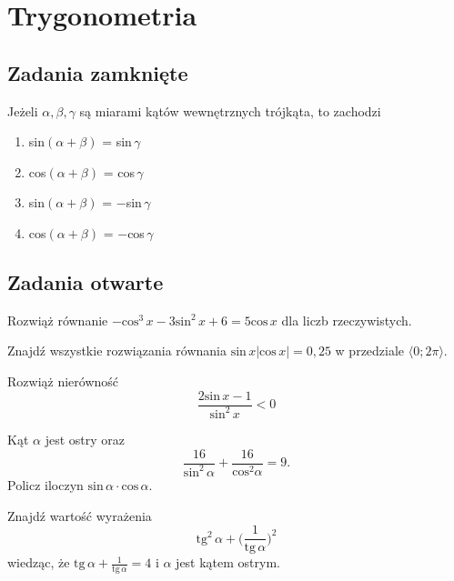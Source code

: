 \setcounter{parc}{0}
\addtocounter{chapc}{1}

\chapter{Trygonometria}

\section{Zadania zamknięte}

\zadanie Jeżeli $\alpha, \beta, \gamma$ są miarami kątów wewnętrznych trójkąta, to zachodzi
\begin{enumerate}[label=\alph*)]
	\item sin$(\alpha + \beta)$ = sin\,$\gamma$ %
	\item cos$(\alpha + \beta)$ = cos\,$\gamma$
	\item sin$(\alpha + \beta)$ = $-$sin\,$\gamma$
	\item cos$(\alpha + \beta)$ = $-$cos\,$\gamma$
\end{enumerate}

\section{Zadania otwarte}

\zadanie Rozwiąż równanie $-\text{cos}^3\,x -3\text{sin}^2\,x + 6 = 5\text{cos}\,x$ dla liczb rzeczywistych.

\zadanie Znajdź wszystkie rozwiązania równania $\text{sin}\, x|\text{cos}\,x| = 0,25$ w przedziale $\langle 0; 2\pi \rangle$.

\zadanie Rozwiąż nierówność \[ \dfrac{2\text{sin}\, x - 1}{\text{sin}^2\, x} < 0 \]

\zadanie Kąt $\alpha$ jest ostry oraz \[ \dfrac{16}{\text{sin}^2\, \alpha} + \dfrac{16}{\text{cos}^2 \alpha} = 9. \] Policz iloczyn $\text{sin}\, \alpha\cdot\text{cos}\, \alpha$.

\zadanie Znajdź wartość wyrażenia \[\text{tg}^2\,\alpha + \bigg(\frac{1}{\text{tg}\,\alpha}\bigg)^2 \] wiedząc, że $\text{tg}\,\alpha + \frac{1}{\text{tg}\,\alpha} = 4$ i $\alpha$ jest kątem ostrym.